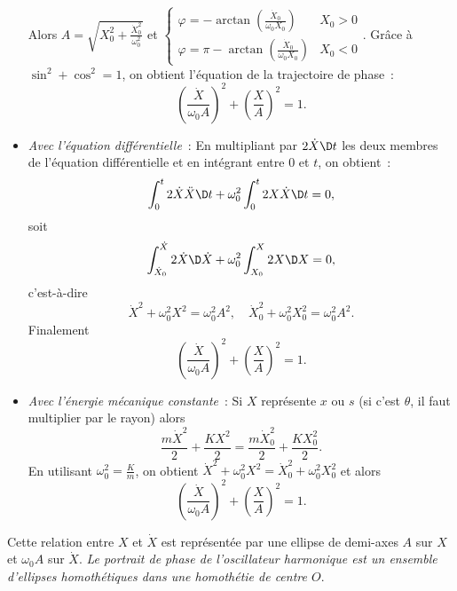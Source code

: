 \begin{itemize}
Alors $A = \sqrt{X_0^2+\frac{\dot{X}_0^2}{\omega_0^2}}$ et $\begin{cases} \varphi=-\arctan\left(\frac{\dot{X}_0}{\omega_0X_0}\right) & X_0>0 \\ \varphi=\pi-\arctan\left(\frac{\dot{X}_0}{\omega_0X_0}\right) & X_0<0\end{cases}$. Grâce à $\sin^2+\cos^2=1$, on obtient l'équation de la trajectoire de phase~:
\begin{equation}
  \left( \frac{\dot{X}}{\omega_0 A} \right)^2 +  \left(\frac{X}{A}\right)^2 =1.
\end{equation}
\item \emph{Avec l'équation différentielle}~: En multipliant par $2\dot{X}\D t$ les deux membres de l'équation différentielle et en intégrant entre $0$ et $t$, on obtient~:
  \begin{equation}
    \int_0^t 2\dot{X} \ddot{X}\D t + \omega_0^2 \int_0^t 2X\dot{X}\D t = 0,
  \end{equation}
  soit
  \begin{equation}
    \int_{\dot{X}_0}^{\dot{X}} 2\dot{X} \D\dot{X} + \omega_0^2 \int_{X_0}^X 2X\D X = 0,
  \end{equation}
  c'est-à-dire
  \begin{equation}
    \dot{X}^2 + \omega_0^2 X^2 =\omega_0^2 A^2, \quad \dot{X}_0^2 + \omega_0^2 X_0^2 = \omega_0^2 A^2.
  \end{equation}
  Finalement
  \begin{equation}
    \left( \frac{\dot{X}}{\omega_0 A} \right)^2 +  \left(\frac{X}{A}\right)^2 =1.
  \end{equation}
\item \emph{Avec l'énergie mécanique constante}~: Si $X$ représente $x$ ou $s$ (si c'est $\theta$, il faut multiplier par le rayon) alors
  \begin{equation}
    \frac{m\dot{X}^2}{2} + \frac{KX^2}{2} = \frac{m\dot{X}_0^2}{2} + \frac{KX_0^2}{2}.
  \end{equation}
  En utilisant $\omega_0^2=\frac{K}{m}$, on obtient $\dot{X}^2+\omega_0^2X^2 = \dot{X}_0^2+\omega_0^2X_0^2$ et alors
  \begin{equation}
    \left( \frac{\dot{X}}{\omega_0 A} \right)^2 +  \left(\frac{X}{A}\right)^2 =1.
  \end{equation}
\end{itemize}

Cette relation entre $X$ et $\dot{X}$ est représentée par une ellipse de demi-axes $A$ sur $X$ et $\omega_0A$ sur $\dot{X}$. \emph{Le portrait de phase de l'oscillateur harmonique est un ensemble d'ellipses homothétiques dans une homothétie de centre $O$}.

